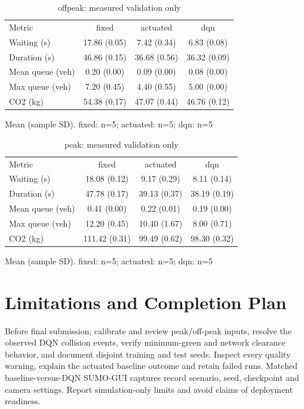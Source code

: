 \documentclass[conference]{IEEEtran}
\begin{document}
\begin{table}[ht]\centering\scriptsize
\caption{offpeak: measured validation only}
\begin{tabular}{lccc}
\toprule
Metric & fixed & actuated & dqn \\
Waiting (s) & 17.86 (0.05) & 7.42 (0.34) & 6.83 (0.08) \\
Duration (s) & 46.86 (0.15) & 36.68 (0.56) & 36.32 (0.09) \\
Mean queue (veh) & 0.20 (0.00) & 0.09 (0.00) & 0.08 (0.00) \\
Max queue (veh) & 7.20 (0.45) & 4.40 (0.55) & 5.00 (0.00) \\
CO2 (kg) & 54.38 (0.17) & 47.07 (0.44) & 46.76 (0.12) \\
\bottomrule\end{tabular}
\par Mean (sample SD). fixed: n=5; actuated: n=5; dqn: n=5
\end{table}
\begin{table}[ht]\centering\scriptsize
\caption{peak: measured validation only}
\begin{tabular}{lccc}
\toprule
Metric & fixed & actuated & dqn \\
Waiting (s) & 18.08 (0.12) & 9.17 (0.29) & 8.11 (0.14) \\
Duration (s) & 47.78 (0.17) & 39.13 (0.37) & 38.19 (0.19) \\
Mean queue (veh) & 0.41 (0.00) & 0.22 (0.01) & 0.19 (0.00) \\
Max queue (veh) & 12.20 (0.45) & 10.40 (1.67) & 8.00 (0.71) \\
CO2 (kg) & 111.42 (0.31) & 99.49 (0.62) & 98.30 (0.32) \\
\bottomrule\end{tabular}
\par Mean (sample SD). fixed: n=5; actuated: n=5; dqn: n=5
\end{table}
\section{Limitations and Completion Plan}
Before final submission, calibrate and review peak/off-peak inputs, resolve the observed DQN collision events, verify minimum-green and network clearance behavior, and document disjoint training and test seeds. Inspect every quality warning, explain the actuated baseline outcome and retain failed runs. Matched baseline-versus-DQN SUMO-GUI captures record scenario, seed, checkpoint and camera settings. Report simulation-only limits and avoid claims of deployment readiness.
\end{document}
